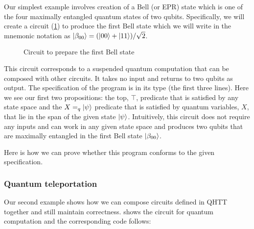 \documentclass[adraft,creativecommons]{eptcs}
\begin{document}
Our simplest example involves creation of a Bell (or EPR) state which is one of the four maximally entangled quantum states of two qubits. Specifically, we will create a circuit (\cref{fig:bell00}) to produce the first Bell state which we will write in the mnemonic notation as $\ket{\beta_{00}} = (\ket{00}+\ket{11})/\sqrt{2}$.

\begin{figure}
    \centering
    \caption{Circuit to prepare the first Bell state}
    \label{fig:bell00}
\end{figure}



This circuit corresponds to a suspended quantum computation that can be composed with other circuits. It takes no input and returns to two qubits as output. The specification of the program is in its type (the first three lines). Here we see our first two propositions: the top, $\top$, predicate that is satisfied by any state space and the $X =_q \ket{\psi}$ predicate that is satisfied by quantum variables, $X$, that lie in the span of the given state $\ket{\psi}$. Intuitively, this circuit does not require any inputs and can work in any given state space and produces two qubits that are maximally entangled in the first Bell state $\ket{\beta_{00}}$.

Here is how we can prove whether this program conforms to the given specification.



\subsubsection{Quantum teleportation}
\label{sec:teleport}
Our second example shows how we can compose circuits defined in QHTT together and still maintain correctness.  shows the circuit for quantum computation and the corresponding code follows:
\end{document}
